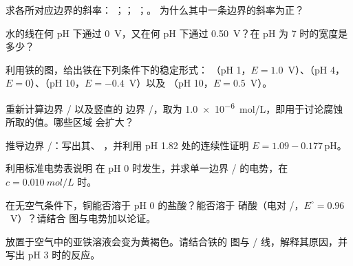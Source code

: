 \begin{exercise}[$\star$]\label{exo:b1:e-ph-diagrams:2}
求各所对应边界的斜率：
；；
；。
为什么其中一条边界的斜率为正？
\end{exercise}

\begin{exercise}[$\star$]\label{exo:b1:e-ph-diagrams:3}
水的线在何 pH 下通过 0~V，又在何 pH 下通过
\qty{0.50}{V}？在
pH 为 7 时的宽度是多少？
\end{exercise}

\begin{exercise}[$\star$]\label{exo:b1:e-ph-diagrams:4}
利用铁的图，给出铁在下列条件下的稳定形式：
（pH 1，$E = 1.0$~V）、（pH 4，$E = 0$）、（pH 10，$E = -0.4$~V）以及
（pH 10，$E = 0.5$~V）。
\end{exercise}

\begin{exercise}[$\star\star$]\label{exo:b1:e-ph-diagrams:5}
重新计算边界 / 以及竖直的
边界 /，取为
\qty{1.0e-6}{mol/L}，即用于讨论腐蚀所取的值。哪些区域
会扩大？
\end{exercise}

\begin{exercise}[$\star\star$]\label{exo:b1:e-ph-diagrams:6}
推导边界 /：写出其、
，并利用 pH 1.82 处的连续性证明 $E = 1.09 -
0.177\,\mathrm{pH}$。
\end{exercise}

\begin{exercise}[$\star\star$]\label{exo:b1:e-ph-diagrams:7}
利用标准电势表说明  在
pH 0 时发生，并求单一边界 /
的电势，在 $c = \qty{0.010}{mol/L}$ 时。
\end{exercise}

\begin{exercise}[$\star\star$]\label{exo:b1:e-ph-diagrams:8}
在无空气条件下，铜能否溶于 pH 0 的盐酸？能否溶于
硝酸（电对 /，$E^\circ = 0.96$~V）？请结合
图与电势加以论证。
\end{exercise}

\begin{exercise}[$\star\star$]\label{exo:b1:e-ph-diagrams:9}
放置于空气中的亚铁溶液会变为黄褐色。请结合铁的
      图与 / 线，解释其原因，并写出 pH 3 时的反应。
\end{exercise}

